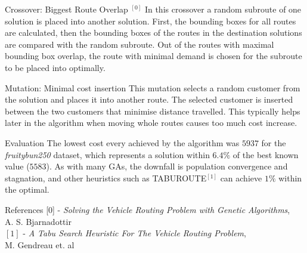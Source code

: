 \documentclass[ %
                    author={Callum Mann},
                     title={Genetic algorithm for the CVRP},
                  subtitle={Capacitated Vehicle Routing Problem},
                      type={Heuristic},
                      year={2016}]{poster}
\begin{document}
\begin{frame}{}
\begin{columns}[t]
\begin{column}{0.450\linewidth}
    \vfill

    \begin{block}{\Large Crossover: Biggest Route Overlap $^{[0]}$}
      In this crossover a random subroute of one solution is placed into another
      solution. First, the bounding boxes for all routes are calculated, then
      the bounding boxes of the routes in the destination solutions are compared
      with the random subroute. Out of the routes with maximal bounding box overlap,
      the route with minimal demand is chosen for the subroute to be placed into optimally.
    \end{block}
    \vspace{1cm}

    \begin{block}{\Large Mutation: Minimal cost insertion}
      This mutation selects a random customer from the solution and places it into
      another route. The selected customer is inserted between the two customers
      that minimise distance travelled. This typically helps later in the
      algorithm when moving whole routes causes too much cost increase.
    \end{block}
    \vspace{1cm}

    \begin{block}{\Large Evaluation}
      The lowest cost every achieved by the algorithm was $5937$ for the \textit{fruitybun250}
      dataset, which represents a solution within $6.4\%$ of the best known value ($5583$). As with many GAs,
      the downfall is population convergence and stagnation, and other heuristics such as TABUROUTE$^{[1]}$
      can achieve $1\%$ within the optimal.
    \end{block}

    \begin{block}{\Large References}
      [0] - \textit{Solving the Vehicle Routing Problem with Genetic Algorithms}, \\ A. S. Bjarnadottir \\
      \vspace{0.5cm} 
      $[1]$ - \textit{A Tabu Search Heuristic For The Vehicle Routing Problem}, \\ M. Gendreau et. al
    \end{block}
    \vspace{1cm}
  \end{column}
\end{columns}

\vfill

\end{frame}

\end{document}
